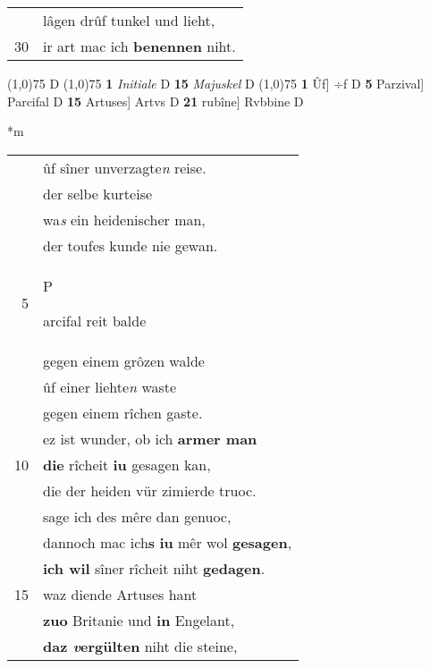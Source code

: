 \documentclass[8pt,a4paper,notitlepage]{article}
\begin{document}
\begin{table}[ht]
\begin{minipage}[t]{0.5\linewidth}
\begin{tabular}{rl}
 & lâgen drûf tunkel und lieht,\\ 
30 & ir art mac ich \textbf{benennen} niht.\\ 
\end{tabular}
\scriptsize
\line(1,0){75} \newline
D \newline
\line(1,0){75} \newline
\textbf{1} \textit{Initiale} D  \textbf{15} \textit{Majuskel} D  \newline
\line(1,0){75} \newline
\textbf{1} Ûf] ÷f D \textbf{5} Parzival] Parcifal D \textbf{15} Artuses] Artvs D \textbf{21} rubîne] Rvbbine D \newline
\end{minipage}
\hspace{0.5cm}
\begin{minipage}[t]{0.5\linewidth}
\small
\begin{center}*m
\end{center}
\begin{tabular}{rl}
 & ûf sîner unverzagte\textit{n} reise.\\ 
 & der selbe kurteise\\ 
 & wa\textit{s} ein heidenischer man,\\ 
 & der toufes kunde nie gewan.\\ 
5 & \begin{large}P\end{large}arcifal reit balde\\ 
 & gegen einem grôzen walde\\ 
 & ûf einer liehte\textit{n} waste\\ 
 & gegen einem rîchen gaste.\\ 
 & ez ist wunder, ob ich \textbf{armer man}\\ 
10 & \textbf{die} rîcheit \textbf{iu} gesagen kan,\\ 
 & die der heiden vür zimierde truoc.\\ 
 & sage ich des mêre dan genuoc,\\ 
 & dannoch mac ich\textbf{s} \textbf{iu} mêr wol \textbf{gesagen},\\ 
 & \textbf{ich wil} sîner rîcheit niht \textbf{gedagen}.\\ 
15 & waz diende Artuses hant\\ 
 & \textbf{zuo} Britanie und \textbf{in} Engelant,\\ 
 & \textbf{daz \textit{v}ergülten} niht die steine,\\ 

\end{tabular}
\end{minipage}
\end{table}
\end{document}
